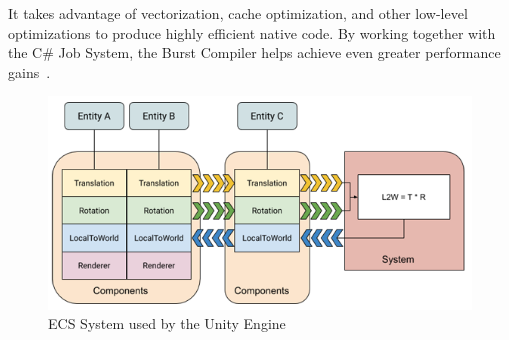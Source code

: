It takes advantage of vectorization, cache optimization, and other low-level optimizations to produce highly efficient native code.
By working together with the C\# Job System, the Burst Compiler helps achieve even greater performance gains~\cite{dots}.
\begin{figure}
    \centering
    \includegraphics[width=\textwidth]{Pictures/res/fundamentals/ECSBlockDiagram-unity}
    \caption{\gls{ECS} System used by the Unity Engine~\cite{unity-ecs}}
    \label{fig:ecs-unity}
\end{figure}
